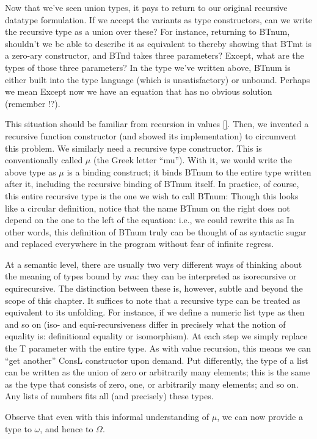 
Now that we’ve seen union types, it pays to return to our original recursive
datatype formulation. If we accept the variants as type constructors, can we
write the recursive type as a union over these? For instance, returning to
BTnum, shouldn’t we be able to describe it as equivalent to
thereby showing that BTmt is a zero-ary constructor, and BTnd takes three
parameters? Except, what are the types of those three parameters? In the type
we’ve written above, BTnum is either built into the type language (which is
unsatisfactory) or unbound. Perhaps we mean
Except now we have an equation that has no obvious solution (remember !?).

This situation should be familiar from recursion in values \ref{}. Then, we
invented a recursive function constructor (and showed its implementation) to
circumvent this problem. We similarly need a recursive type constructor. This is
conventionally called $\mu$ (the Greek letter “mu”). With it, we would write the
above type as
$\mu$ is a binding construct; it binds BTnum to the entire type written after
it, including the recursive binding of BTnum itself. In practice, of course,
this entire recursive type is the one we wish to call BTnum:
Though this looks like a circular definition, notice that the name BTnum on the
right does not depend on the one to the left of the equation: i.e., we could
rewrite this as
In other words, this definition of BTnum truly can be thought of as syntactic
sugar and replaced everywhere in the program without fear of infinite regress.

At a semantic level, there are usually two very different ways of thinking about
the meaning of types bound by $mu$: they can be interpreted as isorecursive or
equirecursive. The distinction between these is, however, subtle and beyond the
scope of this chapter. It suffices to note that a recursive type can be treated
as equivalent to its unfolding. For instance, if we define a numeric list type
as
then
and so on (iso- and equi-recursiveness differ in precisely what the notion of
equality is: definitional equality or isomorphism). At each step we simply
replace the T parameter with the entire type. As with value recursion, this
means we can “get another” ConsL constructor upon demand. Put differently, the
type of a list can be written as the union of zero or arbitrarily many elements;
this is the same as the type that consists of zero, one, or arbitrarily many
elements; and so on. Any lists of numbers fits all (and precisely) these types.

Observe that even with this informal understanding of $\mu$, we can now provide
a type to $\omega$, and hence to $\Omega$. 


